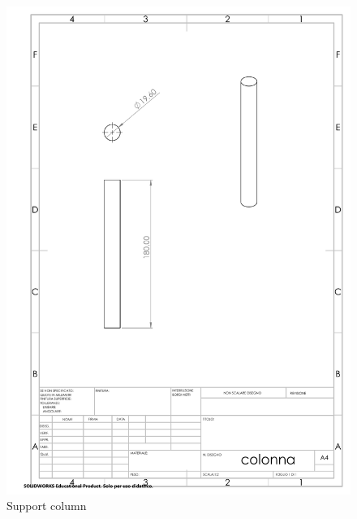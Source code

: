 \documentclass{article}
\begin{document}
\newpage
\begin{figure}[H]
    \centering
    \includegraphics[width=.9\linewidth]{technical_drawings/colonna.pdf}
    \caption{Support column}
    \label{fig:colonna}
\end{figure}
\end{document}
